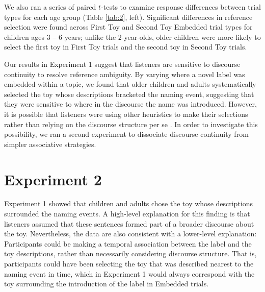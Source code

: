 \documentclass[man]{apa2}
\begin{document}
We also ran a series of paired $t$-tests to examine response differences between trial types for each age group (Table \ref{tab:2}, left).  Significant differences in reference selection were found across First Toy and Second Toy Embedded trial types for children ages 3 -- 6 years; unlike the 2-year-olds, older children were more likely to select the first toy in First Toy trials and the second toy in Second Toy trials.

Our results in Experiment 1 suggest that listeners are sensitive to discourse continuity to resolve reference ambiguity.  By varying where a novel label was embedded within a topic, we found that older children and adults systematically selected the toy whose descriptions bracketed the naming event, suggesting that they were sensitive to where in the discourse the name was introduced.  However, it is possible that listeners were using other heuristics to make their selections rather than relying on the discourse structure per se \cite{samuelson1998}.  In order to investigate this possibility, we ran a second experiment to dissociate discourse continuity from simpler associative strategies. 



 
 
\section{Experiment 2}

Experiment 1 showed that children and adults chose the toy whose descriptions surrounded the naming events. A high-level explanation for this finding is that listeners assumed that these sentences formed part of a broader discourse about the toy. Nevertheless, the data are also consistent with a lower-level explanation: Participants could be making a temporal association between the label and the toy descriptions, rather than necessarily considering discourse structure. That is, participants could have been selecting the toy that was described nearest to the naming event in time, which in Experiment 1 would always correspond with the toy surrounding the introduction of the label in Embedded trials. 
\end{document}
